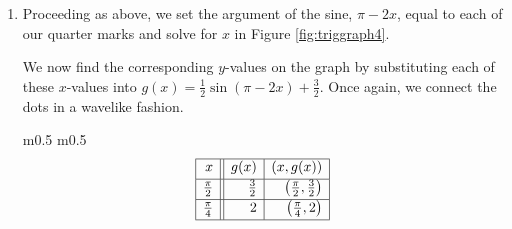 {\begin{enumerate}
\begin{minipage}{\textwidth}
\begin{center}
\begin{tabular}{m{} m{}}
\[\begin{array}{|r||r|r|}
\hline

 x & f(x) & (x,f(x)) \\ [2pt] \hline
1  & 4 & (1,4) \\ [2pt]   \hline

2  & 1 & (2,1) \\ [2pt] \hline 

3 & -2 & (3,-2) \\ [2pt] \hline 

4  & 1 & (4,1) \\ [2pt] \hline 

5 & 4 & (5,4) \\  [2pt] \hline
\end{array} \]
\setlength{\extrarowheight}{0pt} & 
\end{tabular}
\end{center}
\captionsetup{type=figure}
\caption{Plotting one cycle of $y=f(x)$ in Example \ref{cosinesinegraphex1}}
\end{minipage}

\medskip

One cycle is graphed on $[1,5]$ so the period is the length of that interval which is $4$.

\item  Proceeding as above, we set the argument of the sine, $\pi - 2x$, equal to each of our quarter marks and solve for $x$ in Figure \ref{fig:triggraph4}.


We now find the corresponding $y$-values on the graph by substituting each of these $x$-values into  $g(x) = \frac{1}{2} \sin(\pi - 2x) + \frac{3}{2}$.  Once again, we connect the dots in a wavelike fashion.

\medskip

\noindent\hskip-30pt\begin{minipage}{\textwidth}
\begin{center}
\begin{tabular}{m{} m{}}
\setlength{\extrarowheight}{2pt}
\[ \begin{array}{|r||r|r|}  

\hline

 x & g(x) & (x,g(x)) \\ [2pt] \hline
\frac{\pi}{2} & \frac{3}{2} & \left(\frac{\pi}{2}, \frac{3}{2}\right)  \\ [2pt]   \hline

\frac{\pi}{4} & 2 & \left(\frac{\pi}{4}, 2\right) \\ [2pt] \hline 


\end{array}\]
\end{tabular}
\end{center}
\end{minipage}
\end{enumerate}}
